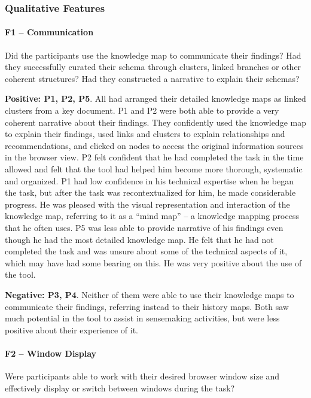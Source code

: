 \subsubsection{Qualitative Features}

\paragraph{F1 -- Communication}
Did the participants use the knowledge map to communicate their findings? Had they successfully curated their schema through clusters, linked branches or other coherent structures? Had they constructed a narrative to explain their schemas?

\textbf{Positive: P1, P2, P5}. All had arranged their detailed knowledge maps as linked clusters from a key document. P1 and P2 were both able to provide a very coherent narrative about their findings. They confidently used the knowledge map to explain their findings, used links and clusters to explain relationships and recommendations, and clicked on nodes to access the original information sources in the browser view. P2 felt confident that he had completed the task in the time allowed and felt that the tool had helped him become more thorough, systematic and organized. P1 had low confidence in his technical expertise when he began the task, but after the task was recontextualized for him, he made considerable progress. He was pleased with the visual representation and interaction of the knowledge map, referring to it as a ``mind map'' -- a knowledge mapping process that he often uses. P5 was less able to provide narrative of his findings even though he had the most detailed knowledge map. He felt that he had not completed the task and was unsure about some of the technical aspects of it, which may have had some bearing on this. He was very positive about the use of the tool.

\textbf{Negative: P3, P4}. Neither of them were able to use their knowledge maps to communicate their findings, referring instead to their history maps. Both saw much potential in the tool to assist in sensemaking activities, but were less positive about their experience of it.

\paragraph{F2 -- Window Display}
Were participants able to work with their desired browser window size and effectively display or switch between windows during the task?

